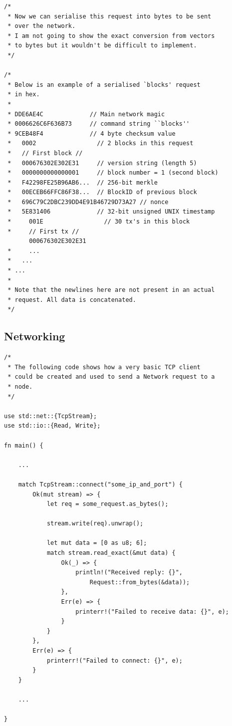 \documentclass{article}
\begin{document}
\newpage

\begin{verbatim}
/*
 * Now we can serialise this request into bytes to be sent
 * over the network.
 * I am not going to show the exact conversion from vectors
 * to bytes but it wouldn't be difficult to implement.
 */

/*
 * Below is an example of a serialised `blocks' request
 * in hex.
 *
 * DDE6AE4C             // Main network magic
 * 0006626C6F636B73     // command string ``blocks''
 * 9CEB48F4             // 4 byte checksum value
 *   0002                 // 2 blocks in this request
 *   // First block //
 *   000676302E302E31     // version string (length 5)
 *   0000000000000001     // block number = 1 (second block)
 *   F42298FE25B96AB6...  // 256-bit merkle
 *   00ECEB66FFC86F38...  // BlockID of previous block
 *   696C79C2DBC239DD4E91B46729D73A27 // nonce
 *   5E831406             // 32-bit unsigned UNIX timestamp
 *     001E                 // 30 tx's in this block
 *     // First tx //
       000676302E302E31
 *     ...
 *   ...
 * ...
 *
 * Note that the newlines here are not present in an actual
 * request. All data is concatenated.
 */

\end{verbatim}

\newpage

\subsection{Networking}
\begin{verbatim}
/*
 * The following code shows how a very basic TCP client
 * could be created and used to send a Network request to a
 * node.
 */

use std::net::{TcpStream};
use std::io::{Read, Write};

fn main() {
    
    ...
    
    match TcpStream::connect("some_ip_and_port") {
        Ok(mut stream) => {
            let req = some_request.as_bytes();

            stream.write(req).unwrap();

            let mut data = [0 as u8; 6];
            match stream.read_exact(&mut data) {
                Ok(_) => {
                    println!("Received reply: {}", 
                        Request::from_bytes(&data));
                },
                Err(e) => {
                    printerr!("Failed to receive data: {}", e);
                }
            }
        },
        Err(e) => {
            printerr!("Failed to connect: {}", e);
        }
    }
    
    ...
    
}

\end{verbatim}
\end{document}
